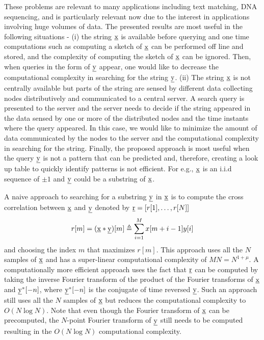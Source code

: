 These problems are relevant to many applications including text matching, DNA sequencing, and is particularly relevant now due to the interest in applications involving huge volumes of data. The presented results are most useful in the following situations - (i) the string $\underline{\mathrm{x}}$ is available before querying and one time computations such as computing a sketch of $\underline{\mathrm{x}}$ can be performed off line and stored, and the complexity of computing the sketch of $\underline{\mathrm{x}}$ can be ignored. Then, when queries in the form of $\underline{\mathrm{y}}$ appear, one would like to decrease the computational complexity in searching for the string $\underline{\mathrm{y}}$. (ii) The string $\underline{\mathrm{x}}$ is not centrally available but parts of the string are sensed by different data collecting nodes distributively and communicated to a central server. A search query is presented to the server and the server needs to decide if the string appeared in the data sensed by one or more of the distributed nodes and the time instants where the query appeared. In this case, we would like to minimize the amount of data communicated by the nodes to the server and the computational complexity in searching for the string. Finally, the proposed approach is most useful when the query $\underline{\mathrm{y}}$ is not a pattern that can be predicted and, therefore, creating a look up table to quickly identify patterns is not efficient. For e.g., $\underline{\mathrm{x}}$ is an i.i.d sequence of $\pm 1$ and $\underline{\mathrm{y}}$ could be a substring of $\underline{\mathrm{x}}$.

A naive approach to searching for a substring $\underline{\mathrm{y}}$ in $\underline{\mathrm{x}}$ is to compute the cross correlation between $\underline{\mathrm{x}}$ and $\underline{\mathrm{y}}$ denoted by  $\underline{\mathrm{r}}=[r[1],\ldots,r[N]]$
\begin{align}
\label{Eqn:DefCrossCorrelation}
r[m]=(\underline{\mathrm{x}}*\underline{\mathrm{y}})[m] \triangleq \sum_{i=1}^{M} x[m+i-1] y[i]
\end{align}
and choosing the index $m$ that maximizes $r[m]$. This approach uses all the $N$ samples of $\underline{\mathrm{x}}$ and has a super-linear computational complexity of $MN = N^{1+\mu}$. A computationally more efficient approach uses the fact that $\underline{\mathrm{r}}$ can be computed by taking the inverse Fourier transform of the product of the Fourier transforms of $\underline{\mathrm{x}}$ and $ \underline{\mathrm{y}}^*[-n]$, where $\underline{\mathrm{y}}^*[-n]$ is the conjugate of time reversed $\underline{\mathrm{y}}$. Such an approach still uses all the $N$ samples of $\underline{\mathrm{x}}$ but reduces the computational complexity to $O(N \log N)$. Note that even though the Fourier transform of $\underline{\mathrm{x}}$ can be precomputed, the $N$-point Fourier transform of $\underline{\mathrm{y}}$ still needs to be computed resulting in the $O(N \log N)$ computational complexity.


